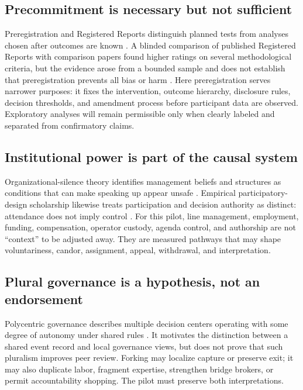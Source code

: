 \documentclass[11pt]{article}
\begin{document}
\subsection{Precommitment is necessary but not sufficient}

Preregistration and Registered Reports distinguish planned tests from analyses
chosen after outcomes are known \citep{nosek2018preregistration}. A blinded
comparison of published Registered Reports with comparison papers found higher
ratings on several methodological criteria, but the evidence arose from a bounded
sample and does not establish that preregistration prevents all bias or harm
\citep{soderberg2021registered}. Here preregistration serves narrower purposes: it
fixes the intervention, outcome hierarchy, disclosure rules, decision thresholds,
and amendment process before participant data are observed. Exploratory analyses
will remain permissible only when clearly labeled and separated from confirmatory
claims.

\subsection{Institutional power is part of the causal system}

Organizational-silence theory identifies management beliefs and structures as
conditions that can make speaking up appear unsafe \citep{morrison2000silence}.
Empirical participatory-design scholarship likewise treats participation and
decision authority as distinct: attendance does not imply control
\citep{bratteteig2014participation}. For this pilot, line management, employment,
funding, compensation, operator custody, agenda control, and authorship are not
``context'' to be adjusted away. They are measured pathways that may shape
voluntariness, candor, assignment, appeal, withdrawal, and interpretation.

\subsection{Plural governance is a hypothesis, not an endorsement}

Polycentric governance describes multiple decision centers operating with some
degree of autonomy under shared rules \citep{ostrom2010polycentric}. It motivates
the distinction between a shared event record and local governance views, but does
not prove that such pluralism improves peer review. Forking may localize capture or
preserve exit; it may also duplicate labor, fragment expertise, strengthen bridge
brokers, or permit accountability shopping. The pilot must preserve both
interpretations.
\end{document}
